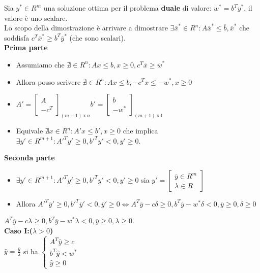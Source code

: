 \documentclass{article}
\begin{document}
\begin{tcolorbox}[
    colback=lightgray,
    colframe=black,
    coltext=black,
    title=Dimostrazione,
    colbacktitle=black,
    coltitle=lightgray,
    breakable
  ]
  Sia $y^{\ast} \in R^m$ una soluzione ottima per il problema \textbf{duale} di valore: $w^{\ast}=b^Ty^{\ast}$, il valore è uno scalare. \\
  Lo scopo della dimostrazione è arrivare a dimostrare $\exists\overline{x}^{\ast}\in R^n: A\overline{x}^{\ast}\le\overline{b}, \overline{x}^{\ast}$ che soddisfa $c^T\overline{x}^{\ast}\ge b^T\overline{y}^{\ast}$ (che sono scalari).\\
  \textbf{Prima parte}
  \begin{itemize}
    \item Assumiamo che $\nexists \in R^n: Ax \le b, x \ge 0, c^T\overline{x} \ge \overline{w}^{\ast}$
    \item Allora posso scrivere $\nexists \in R^n: Ax \le b, -c^Tx\le -w^{\ast}, x\ge 0$
    \item $A'=\begin{bmatrix}A \\ -c^T\end{bmatrix}_{(m+1)\ \text{x}\ n} b'=\begin{bmatrix}b \\ -w^{\ast}\end{bmatrix}_{(m+1)\ \text{x}\ 1}$
    \item Equivale $\nexists x \in R^n: A'x \le b', x \ge 0$ che implica $\exists y' \in R^{m+1}:A'^Ty' \ge 0, b'^Ty' < 0, y' \ge 0$.
  \end{itemize}
  \textbf{Seconda parte}
  \begin{itemize}
    \item $\exists y' \in R^{m+1}:A'^Ty' \ge 0, b'^Ty' < 0, y' \ge 0$ sia $y'=\begin{bmatrix}\overline{y}\in R^m\\ \lambda \in R \end{bmatrix}$
    \item Allora $A'^T\overline{y}' \ge 0, b'^T\overline{y}' < 0, \overline{y}'\ge 0 \Leftrightarrow A^T\overline{y}-c\delta\ge 0, b^T\overline{y}-w^{\ast}\delta<0, \overline{y}\ge 0, \delta \ge 0$
  \end{itemize}
  $A^T\overline{y}-c\lambda \ge 0, b^T\overline{y}-w^{\ast}\lambda<0,\overline{y}\ge 0, \lambda \ge 0$.\\
  \textbf{Caso I:($\lambda > 0$)}\\
  $\hat{y}=\frac{\overline{y}}{\lambda}$ si ha $\begin{cases}A^T\hat{y}\ge c \\ b^T \hat{y} < w^{\ast} \\ \hat{y} \ge 0 \end{cases}$\\


\end{tcolorbox}
\end{document}
